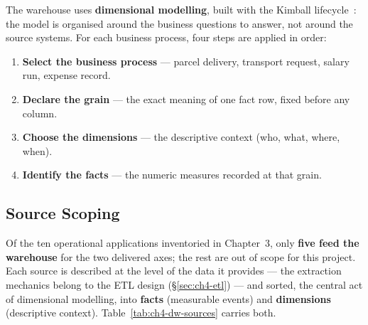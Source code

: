 The warehouse uses \textbf{dimensional modelling}, built with the Kimball
lifecycle~\parencite{kimball2013}: the model is organised around the business questions to answer, not
around the source systems. For each business process, four steps are applied in order:

\begin{enumerate}[noitemsep]
    \item \textbf{Select the business process} --- parcel delivery, transport request, salary run,
          expense record.
    \item \textbf{Declare the grain} --- the exact meaning of one fact row, fixed before any column.
    \item \textbf{Choose the dimensions} --- the descriptive context (who, what, where, when).
    \item \textbf{Identify the facts} --- the numeric measures recorded at that grain.
\end{enumerate}

\subsection{Source Scoping}
\label{subsec:ch4-dw-sources}

Of the ten operational applications inventoried in Chapter~3, only \textbf{five feed the warehouse} for
the two delivered axes; the rest are out of scope for this project. Each source is described at the level of
the data it provides --- the extraction mechanics belong to the ETL design (\S\ref{sec:ch4-etl}) ---
and sorted, the central act of dimensional modelling, into \textbf{facts} (measurable events) and
\textbf{dimensions} (descriptive context). Table~\ref{tab:ch4-dw-sources} carries both.

